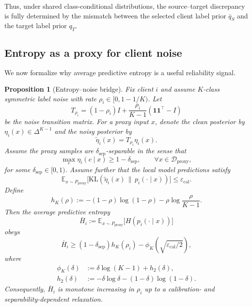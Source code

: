 \documentclass[conference]{IEEEtran}
\newtheorem{proposition}{Proposition}
\theoremstyle{definition}
\theoremstyle{remark}
\begin{document}
Thus, under shared class-conditional distributions, the source--target discrepancy is fully determined by the mismatch between the selected client label prior $\bar q_S$ and the target label prior $q_T$.

\subsection{Entropy as a proxy for client noise}
\label{app:entropy_proxy}

We now formalize why average predictive entropy is a useful reliability signal.

\begin{proposition}[Entropy--noise bridge]
\label{prop:entropy_bridge_appendix}
Fix client $i$ and assume $K$-class symmetric label noise with rate $\rho_i\in[0,1-1/K)$. Let
\begin{equation}
T_{\rho_i}
=
(1-\rho_i)I + \frac{\rho_i}{K-1}(\mathbf{1}\mathbf{1}^\top-I)
\end{equation}
be the noise transition matrix. For a proxy input $x$, denote the clean posterior by $\eta_i(x)\in\Delta^{K-1}$ and the noisy posterior by
\begin{equation}
\tilde \eta_i(x)=T_{\rho_i}\eta_i(x).
\end{equation}
Assume the proxy samples are $\delta_{\mathrm{sep}}$-separable in the sense that
\begin{equation}
\max_c \eta_i(c\mid x) \ge 1-\delta_{\mathrm{sep}},
\qquad \forall x\in\mathcal{D}_{\mathrm{proxy}},
\end{equation}
for some $\delta_{\mathrm{sep}}\in[0,1)$. Assume further that the local model predictions satisfy
\begin{equation}
\mathbb{E}_{x\sim P_{\mathrm{proxy}}}
\big[
\mathrm{KL}(\tilde\eta_i(x)\,\|\,p_i(\cdot\mid x))
\big]
\le \varepsilon_{\mathrm{cal}}.
\end{equation}
Define
\begin{equation}
 h_K(\rho)
 :=
 -(1-\rho)\log(1-\rho)
 - \rho\log\frac{\rho}{K-1}.
\end{equation}
Then the average predictive entropy
\begin{equation}
\bar H_i
:=
\mathbb{E}_{x\sim P_{\mathrm{proxy}}}
\big[H(p_i(\cdot\mid x))\big]
\end{equation}
obeys
\begin{equation}
\label{eq:entropy_bridge_appendix}
\bar H_i
\ge
(1-\delta_{\mathrm{sep}})h_K(\rho_i)
- \phi_K\!\left(\sqrt{\varepsilon_{\mathrm{cal}}/2}\right),
\end{equation}
where
\begin{align}
\phi_K(\delta)
&:=\delta\log(K-1)+h_2(\delta),\\
h_2(\delta)
&:=-\delta\log\delta-(1-\delta)\log(1-\delta).
\end{align}
Consequently, $\bar H_i$ is monotone increasing in $\rho_i$ up to a calibration- and separability-dependent relaxation.
\end{proposition}
\end{document}
